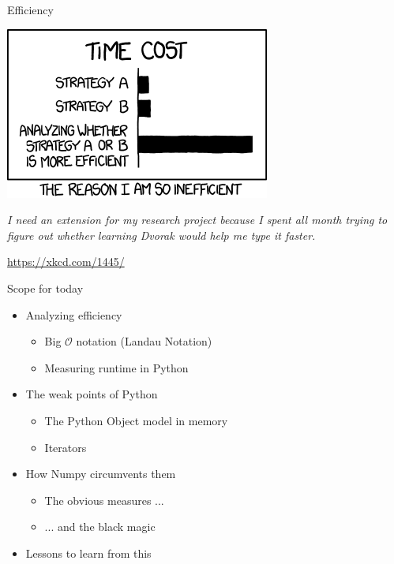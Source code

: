 
\begin{frame}[t,plain]
\titlepage
\end{frame}


\begin{frame}{Efficiency}
%
\begin{center}
	\includegraphics[width=.4\linewidth]{./gfx/05-xkcd-efficiency}\\
	\vspace{6pt}
	
	\scriptsize
	\emph{I need an extension for my research project because I spent all month trying to figure out whether learning Dvorak would help me type it faster.}

	\vspace{6pt}
	\url{https://xkcd.com/1445/}
\end{center}
%
\end{frame}


\begin{frame}{Scope for today}
%
\begin{itemize}
\item Analyzing efficiency
	\begin{itemize}
	\item Big $\mathcal{O}$ notation (Landau Notation)
	\item Measuring runtime in Python
	\end{itemize}
\item The weak points of Python
	\begin{itemize}
	\item The Python Object model in memory
	\item Iterators
	\end{itemize}
\item How Numpy circumvents them
	\begin{itemize}
	\item The obvious measures ...
	\item ... and the black magic
	\end{itemize}
\item Lessons to learn from this
\end{itemize}
%
\end{frame}


